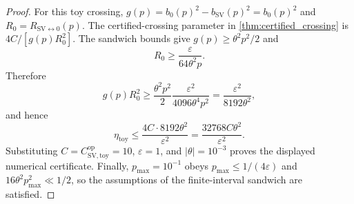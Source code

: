 \documentclass[11pt]{article}
\newcommand{\1}{\mathbf{1}}
\begin{document}
\begin{proof}
For this toy crossing, \(g(p)=b_0(p)^2-b_{\mathrm{SV}}(p)^2=b_0(p)^2\) and \(R_0=R_{\mathrm{SV}\leftrightarrow0}(p)\).  The certified-crossing parameter in \cref{thm:certified_crossing} is \(4C/[g(p)R_0^2]\).  The sandwich bounds give \(g(p)\ge\theta^2p^2/2\) and
\begin{equation}
    R_0\ge\frac{\varepsilon}{64\theta^2p}.
\end{equation}
Therefore
\begin{equation}
    g(p)R_0^2
    \ge
    \frac{\theta^2p^2}{2}\frac{\varepsilon^2}{4096\theta^4p^2}
    =\frac{\varepsilon^2}{8192\theta^2},
\end{equation}
and hence
\begin{equation}
    \eta_{\mathrm{toy}}
    \le
    \frac{4C\cdot8192\theta^2}{\varepsilon^2}
    =\frac{32768C\theta^2}{\varepsilon^2}.
\end{equation}
Substituting \(C=C_{\mathrm{SV},\mathrm{toy}}^{\mathrm{op}}=10\), \(\varepsilon=1\), and \(|\theta|=10^{-3}\) proves the displayed numerical certificate.  Finally, \(p_{\max}=10^{-1}\) obeys \(p_{\max}\le1/(4\varepsilon)\) and \(16\theta^2p_{\max}^2\ll1/2\), so the assumptions of the finite-interval sandwich are satisfied.
\end{proof}
\end{document}
